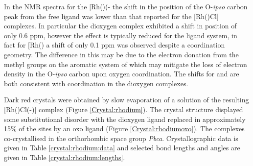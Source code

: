 In the \carbon{} NMR spectra for the [Rh(\tBuxantphos)(-\ce{O2)Cl]} the shift in the position of the O-\emph{ipso} carbon peak from the free ligand was lower than that reported for the [Rh(\tBuxantphos)Cl] complexes.  In particular the \tButhixantphos{} dioxygen complex exhibited a shift in position of only 0.6 ppm, however the effect is typically reduced for the \tButhixantphos{} ligand system, in fact for [Rh(\tButhixantphos)\ce{(H)2Cl]} a shift of only 0.1 ppm was observed despite a \dento{}\POP{} coordination geometry.  The difference in this may be due to the electron donation from the methyl groups on the aromatic system of \tButhixantphos{} which may mitigate the loss of electron density in the O-\emph{ipso} carbon upon oxygen coordination.  The shifts for \tBusixantphos{} and \tBuxantphos{} are both consistent with \dento{}\POP{} coordination in the dioxygen complexes.  

Dark red crystals were obtained by slow evaporation of a  solution of the resulting [Rh(\tBuxantphosk)Cl(-)] complex (Figure \ref{Crystal:rhodium}).  The crystal structure displayed some substitutional disorder with the dioxygen ligand replaced in approximately 15\% of the sites by an oxo ligand (Figure \ref{Crystal:rhodiumoxo}).  The complexes co-crystallised in the orthorhombic space group \emph{Pbca}.  Crystallographic data is given in Table \ref{crystal:rhodium:data} and selected bond lengths and angles are given in Table \ref{crystal:rhodium:lengths}.



